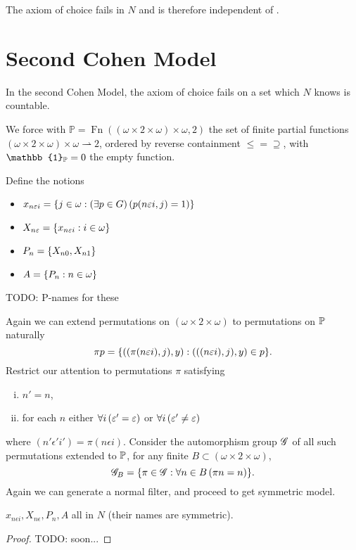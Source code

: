 \begin{theorem}
    The axiom of choice fails in \(N\) and is therefore independent of \ZF.
\end{theorem}




\section{Second Cohen Model}

In the second Cohen Model, the axiom of choice fails on a set which \(N\) knows is countable.


We force with \(\mathbb{P} = \operatorname{Fn}((\omega\times 2 \times\omega)\times\omega, 2)\)
the set of finite partial functions \((\omega\times 2 \times\omega)\times\omega \rightharpoonup 2\),
ordered by reverse containment \(\leq = \supseteq\),
with \(\mathbb{1}_\P = 0\) the empty function.

Define the notions
\begin{itemize}
    \item \(x_{n\epsilon i} = \set{j\in\omega: \left(\exists p\in G\right) \left(p(n\epsilon i, j) = 1\right) }\)
    \item \(X_{n\epsilon} = \set{x_{n\epsilon i}: i\in\omega}\)
    \item \(P_n = \set{X_{n0}, X_{n1}}\)
    \item \(A = \set{P_n:n\in\omega}\)
\end{itemize}

TODO: P-names for these

Again we can extend permutations on \((\omega\times2\times\omega)\) to permutations on \(\P\) naturally
\[\pi p = \set{ ((\pi(n\epsilon i), j), y): (((n\epsilon i),j), y) \in p }.\]
Restrict our attention to permutations \(\pi\) satisfying
\begin{enumerate}[i.]
    \item \(n' = n\),
    \item for each \(n\) either \(\forall i\paren{\epsilon' = \epsilon}\) or \(\forall i\paren{\epsilon' \ne \epsilon}\)
\end{enumerate}
where \((n'\epsilon' i') = \pi(n\epsilon i)\).
Consider the automorphism group \(\G\) of all such permutations extended to \(\P\),
for any finite \(B\subset (\omega\times2\times\omega)\),
\[ \G_B = \set{ \pi\in \G: \forall n\in B\left( \pi n = n \right) }. \]
Again we can generate a normal filter, and proceed to get symmetric model.


\begin{lemma}
    \(x_{n\epsilon i}, X_{n\epsilon}, P_n, A\) all in \(N\) (their names are symmetric).
\end{lemma}
\begin{proof}
    TODO: soon...
\end{proof}

